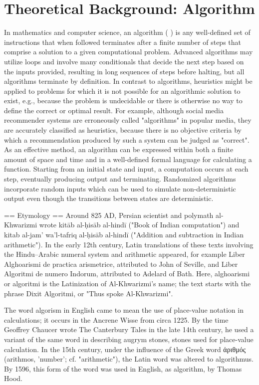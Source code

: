 \documentclass[12pt,a4paper]{report}
\begin{document}
\section{Theoretical Background: Algorithm}
In mathematics and computer science, an algorithm ( ) is any well-defined set of instructions that when followed terminates after a finite number of steps that comprise a solution to a given computational problem. Advanced algorithms may utilize loops and involve many conditionals that decide the next step based on the inputs provided, resulting in long sequences of steps before halting, but all algorithms terminate by definition.
In contrast to algorithms, heuristics might be applied to problems for which it is not possible for an algorithmic solution to exist, e.g., because the problem is undecidable or there is otherwise no way to define the correct or optimal result. For example, although social media recommender systems are erroneously called "algorithms" in popular media, they are accurately classified as heuristics, because there is no objective criteria by which a recommendation produced by such a system can be judged as "correct".
As an effective method, an algorithm can be expressed within both a finite amount of space and time and in a well-defined formal language for calculating a function. Starting from an initial state and input, a computation occurs at each step, eventually producing output and terminating.  Randomized algorithms incorporate random inputs which can be used to simulate non-deterministic output even though the transitions between states are deterministic.


== Etymology ==
Around 825 AD, Persian scientist and polymath al-Khwarizmi wrote kitāb al-ḥisāb al-hindī ("Book of Indian computation") and kitab al-jam' wa'l-tafriq al-ḥisāb al-hindī ("Addition and subtraction in Indian arithmetic"). In the early 12th century, Latin translations of these texts involving the Hindu–Arabic numeral system and arithmetic appeared, for example Liber Alghoarismi de practica arismetrice, attributed to John of Seville, and Liber Algoritmi de numero Indorum, attributed to Adelard of Bath. Here, alghoarismi or algoritmi is the Latinization of Al-Khwarizmi's name; the text starts with the phrase Dixit Algoritmi, or "Thus spoke Al-Khwarizmi".

 
The word algorism in English came to mean the use of place-value notation in calculations; it occurs in the Ancrene Wisse from circa 1225. By the time Geoffrey Chaucer wrote The Canterbury Tales in the late 14th century, he used a variant of the same word in describing augrym stones, stones used for place-value calculation. In the 15th century, under the influence of the Greek word ἀριθμός (arithmos, 'number'; cf. "arithmetic"), the Latin word was altered to algorithmus. By 1596, this form of the word was used in English, as algorithm, by Thomas Hood.
\end{document}
